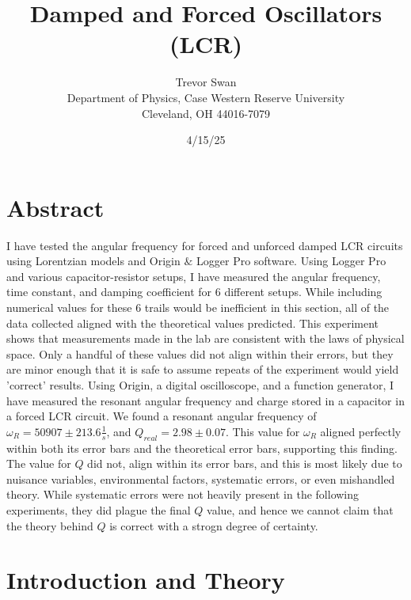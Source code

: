 \documentclass[12pt]{article}
\title{Damped and Forced Oscillators \\ \small (LCR)}
\author{Trevor Swan \\
Department of Physics, Case Western Reserve University \\
Cleveland, OH 44016-7079}
\date{4/15/25}
\begin{document}


\pagestyle{fancy}
\fancyhf{}

\maketitle
\thispagestyle{fancy}
\renewcommand{\headrulewidth}{0pt}

\fancyfoot[C]{\thepage}

\section{Abstract}
I have tested the angular frequency for forced and unforced damped LCR circuits using  Lorentzian models and Origin $\&$ Logger Pro software. Using Logger Pro and various capacitor-resistor setups, I have measured the angular frequency, time constant, and damping coefficient for 6 different setups. While including numerical values for these 6 trails would be inefficient in this section, all of the data collected aligned with the theoretical values predicted. This experiment shows that measurements made in the lab are consistent with the laws of physical space. Only a handful of these values did not align within their errors, but they are minor enough that it is safe to assume repeats of the experiment would yield 'correct' results. Using Origin, a digital oscilloscope, and a function generator, I have measured the resonant angular frequency and charge stored in a capacitor in a forced LCR circuit. We found a resonant angular frequency of $\omega_R=50907\pm213.6 \frac{1}{s}$, and $Q_{real}=2.98\pm0.07$. This value for $\omega_R$ aligned perfectly within both its error bars and the theoretical error bars, supporting this finding. The value for $Q$ did not, align within its error bars, and this is most likely due to nuisance variables, environmental factors, systematic errors, or even mishandled theory. While systematic errors were not heavily present in the following experiments, they did plague the final $Q$ value, and hence we cannot claim that the theory behind $Q$ is correct with a strogn degree of certainty.

\section{Introduction and Theory}
\end{document}

